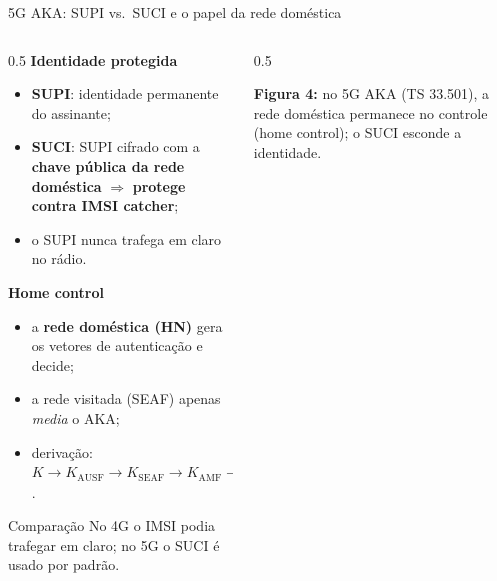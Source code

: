 \documentclass[aspectratio=169,11pt]{beamer}
\begin{document}
\begin{frame}{5G AKA: SUPI vs.\ SUCI e o papel da rede doméstica}
  \begin{columns}
    \begin{column}{0.5\textwidth}
      \textbf{Identidade protegida}
      \begin{itemize}\small
        \item \textbf{SUPI}: identidade permanente do assinante;
        \item \textbf{SUCI}: SUPI cifrado com a \textbf{chave pública da rede doméstica} $\Rightarrow$ \textbf{protege contra IMSI catcher};
        \item o SUPI nunca trafega em claro no rádio.
      \end{itemize}
      \textbf{Home control}
      \begin{itemize}\small
        \item a \textbf{rede doméstica (HN)} gera os vetores de autenticação e decide;
        \item a rede visitada (SEAF) apenas \emph{media} o AKA;
        \item derivação: $K \to K_{\text{AUSF}} \to K_{\text{SEAF}} \to K_{\text{AMF}} \to K_{\text{gNB}}$.
      \end{itemize}
      \pause
      \begin{alertblock}{Comparação}
        No 4G o IMSI podia trafegar em claro; no 5G o SUCI é usado por padrão.
      \end{alertblock}
    \end{column}
    \begin{column}{0.5\textwidth}
      \begin{center}
      \end{center}
      \vspace{1mm}
      {\scriptsize \textbf{Figura 4:} no 5G AKA (TS 33.501), a rede doméstica permanece no controle (home control); o SUCI esconde a identidade.}
    \end{column}
  \end{columns}
\end{frame}
\end{document}
